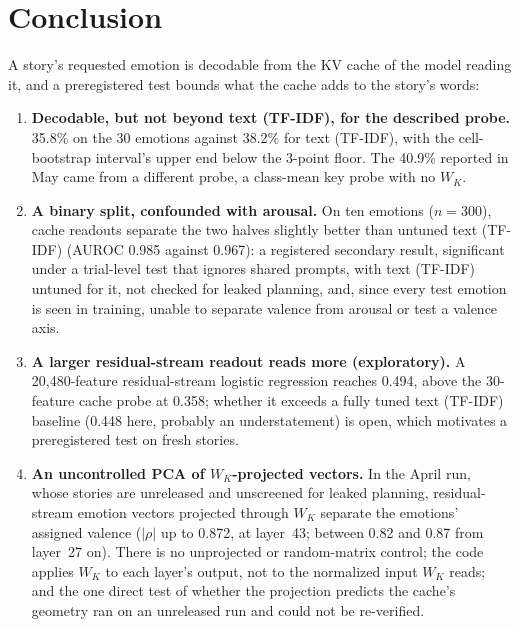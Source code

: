 \documentclass[11pt,a4paper]{article}
\begin{document}
\section{Conclusion}

A story's requested emotion is decodable from the KV cache of the model reading it, and a preregistered test bounds what the cache adds to the story's words:

\begin{enumerate}[nosep]
    \item \textbf{Decodable, but not beyond text (TF-IDF), for the described probe.} 35.8\% on the 30 emotions against 38.2\% for text (TF-IDF), with the cell-bootstrap interval's upper end below the 3-point floor. The 40.9\% reported in May came from a different probe, a class-mean key probe with no $W_K$.
    \item \textbf{A binary split, confounded with arousal.} On ten emotions ($n = 300$), cache readouts separate the two halves slightly better than untuned text (TF-IDF) (AUROC 0.985 against 0.967): a registered secondary result, significant under a trial-level test that ignores shared prompts, with text (TF-IDF) untuned for it, not checked for leaked planning, and, since every test emotion is seen in training, unable to separate valence from arousal or test a valence axis.
    \item \textbf{A larger residual-stream readout reads more (exploratory).} A 20{,}480-feature residual-stream logistic regression reaches 0.494, above the 30-feature cache probe at 0.358; whether it exceeds a fully tuned text (TF-IDF) baseline (0.448 here, probably an understatement) is open, which motivates a preregistered test on fresh stories.
    \item \textbf{An uncontrolled PCA of $W_K$-projected vectors.} In the April run, whose stories are unreleased and unscreened for leaked planning, residual-stream emotion vectors projected through $W_K$ separate the emotions' assigned valence ($|\rho|$ up to 0.872, at layer~43; between 0.82 and 0.87 from layer~27 on). There is no unprojected or random-matrix control; the code applies $W_K$ to each layer's output, not to the normalized input $W_K$ reads; and the one direct test of whether the projection predicts the cache's geometry ran on an unreleased run and could not be re-verified.
\end{enumerate}
\end{document}
